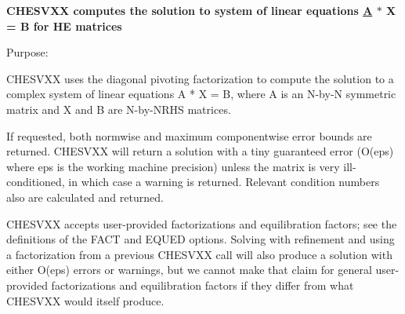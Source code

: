 {\bfseries  C\+H\+E\+S\+V\+X\+X computes the solution to system of linear equations \hyperlink{classA}{A} $\ast$ X = B for H\+E matrices} 

 \begin{DoxyParagraph}{Purpose\+: }
\begin{DoxyVerb}    CHESVXX uses the diagonal pivoting factorization to compute the
    solution to a complex system of linear equations A * X = B, where
    A is an N-by-N symmetric matrix and X and B are N-by-NRHS
    matrices.

    If requested, both normwise and maximum componentwise error bounds
    are returned. CHESVXX will return a solution with a tiny
    guaranteed error (O(eps) where eps is the working machine
    precision) unless the matrix is very ill-conditioned, in which
    case a warning is returned. Relevant condition numbers also are
    calculated and returned.

    CHESVXX accepts user-provided factorizations and equilibration
    factors; see the definitions of the FACT and EQUED options.
    Solving with refinement and using a factorization from a previous
    CHESVXX call will also produce a solution with either O(eps)
    errors or warnings, but we cannot make that claim for general
    user-provided factorizations and equilibration factors if they
    differ from what CHESVXX would itself produce.\end{DoxyVerb}
 
\end{DoxyParagraph}
